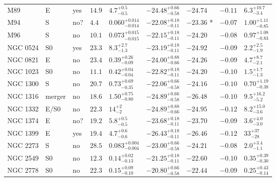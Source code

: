 \begin{table*}
\begin{center}
\begin{tabular}{lllllllll}
M89  &  E  &  yes   &  $14.9$  &  $4.7_{-0.5}^{+0.5}$   &  $-24.48_{-0.58}^{+0.66}$   &  $-24.74$   &  $-0.11$  &  $6.3_{-3.4}^{+10.7}$   \\ 
M94  &  S  &  no?  &  $4.4$  &  $0.060_{-0.014}^{+0.014}$   &  $-22.08_{-0.11}^{+0.18}$   &  $-23.36$  *  &  $-0.07$  &  $1.00_{-0.85}^{+1.11}$   \\ 
M96  &  S  &  no   &  $10.1$  &  $0.073_{-0.015}^{+0.015}$   &  $-22.15_{-0.11}^{+0.18}$   &  $-24.20$   &  $-0.08$  &  $0.97_{-0.83}^{+1.08}$   \\ 
NGC 0524  &  S0  &  yes   &  $23.3$  &  $8.3_{-1.3}^{+2.7}$   &  $-23.19_{-0.11}^{+0.18}$   &  $-24.92$   &  $-0.09$  &  $2.2_{-1.9}^{+2.5}$   \\ 
NGC 0821  &  E  &  no   &  $23.4$  &  $0.39_{-0.09}^{+0.26}$   &  $-24.00_{-0.66}^{+0.88}$   &  $-24.26$   &  $-0.09$  &  $4.7_{-2.1}^{+8.7}$   \\ 
NGC 1023  &  S0  &  no   &  $11.1$  &  $0.42_{-0.04}^{+0.04}$   &  $-22.82_{-0.11}^{+0.18}$   &  $-24.20$   &  $-0.10$  &  $1.5_{-1.3}^{+1.7}$   \\ 
NGC 1300  &  S  &  no   &  $20.7$  &  $0.73_{-0.35}^{+0.69}$   &  $-22.06_{-0.58}^{+0.66}$   &  $-24.16$   &  $-0.10$  &  $0.70_{-0.38}^{+1.19}$   \\ 
NGC 1316  &  merger  &  no   &  $18.6$  &  $1.50_{-0.80}^{+0.75}$   &  $-24.89_{-0.58}^{+0.66}$   &  $-26.48$   &  $-0.10$  &  $9.5_{-5.2}^{+16.2}$   \\ 
NGC 1332  &  E/S0  &  no   &  $22.3$  &  $14_{-2}^{+2}$   &  $-24.89_{-0.66}^{+0.88}$   &  $-24.95$   &  $-0.12$  &  $8.2_{-3.6}^{+15.0}$   \\ 
NGC 1374  &  E  &  no?  &  $19.2$  &  $5.8_{-0.5}^{+0.5}$   &  $-23.68_{-0.11}^{+0.18}$   &  $-23.70$   &  $-0.09$  &  $3.6_{-3.0}^{+4.0}$   \\ 
NGC 1399  &  E  &  yes   &  $19.4$  &  $4.7_{-0.6}^{+0.6}$   &  $-26.43_{-0.11}^{+0.18}$   &  $-26.46$   &  $-0.12$  &  $33_{-28}^{+37}$   \\ 
NGC 2273  &  S  &  no   &  $28.5$  &  $0.083_{-0.004}^{+0.004}$   &  $-23.00_{-0.58}^{+0.66}$   &  $-24.21$   &  $-0.08$  &  $2.0_{-1.1}^{+3.4}$   \\ 
NGC 2549  &  S0  &  no   &  $12.3$  &  $0.14_{-0.13}^{+0.02}$   &  $-21.25_{-0.11}^{+0.18}$   &  $-22.60$   &  $-0.10$  &  $0.35_{-0.30}^{+0.39}$   \\ 
NGC 2778  &  S0  &  no   &  $22.3$  &  $0.15_{-0.10}^{+0.09}$   &  $-20.80_{-0.58}^{+0.66}$   &  $-22.44$   &  $-0.09$  &  $0.25_{-0.14}^{+0.43}$   \\ 

\end{tabular}
\end{center}
\end{table*}
